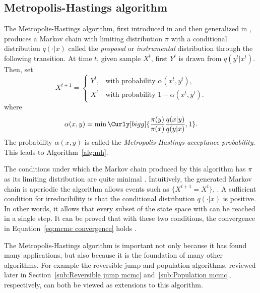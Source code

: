 \subsection{Metropolis-Hastings algorithm}
\label{sub:Metropolis-Hastings algorithm}

The Metropolis-Hastings algorithm, first introduced in \cite{Metropolis:1953ex} and then generalized in \cite{Hastings:1970gd}, produces a Markov chain with limiting distribution $\pi$ with a conditional distribution $q(\cdot|x)$ called the \emph{proposal} or \emph{instrumental} distribution through the following transition. At time $t$, given sample $X^t$, first $Y^t$ is drawn from $q(y^t|x^t)$. Then, set
\begin{equation*}
  X^{t+1} =
  \begin{cases}
    Y^t, &\text{with probability } \alpha(x^t,y^t),\\
    X^t  &\text{with probability } 1 - \alpha(x^t,y^t).
  \end{cases}
\end{equation*}
where
\begin{equation}
  \alpha(x,y) =
  \min\Curly[bigg]{\frac{\pi(y)}{\pi(x)}\frac{q(x|y)}{q(y|x)},1}.
\end{equation}
The probability $\alpha(x,y)$ is called the \emph{Metropolis-Hastings acceptance probability}. This leads to Algorithm~\ref{alg:mh}.



The conditions under which the Markov chain produced by this algorithm has $\pi$ as its limiting distribution are quite minimal \cite[][sec.~7.3.2]{Robert:2004tn}. Intuitively, the generated Markov chain is aperiodic  the algorithm allows events such as $\{X^{t+1} = X^t\}$, . A sufficient condition for irreducibility is that the conditional distribution $q(\cdot|x)$ is positive. In other words, it allows that every subset of the state space with can be reached in a single step. It can be proved that with these two conditions, the convergence in Equation~\eqref{eq:mcmc convergence} holds \cite[][Theorem~7.4 and Corollary~7.5]{Robert:2004tn}.

The Metropolis-Hastings algorithm is important not only because it has found many applications, but also because it is the foundation of many other algorithms. For example the reversible jump \mcmc and population \mcmc algorithms, reviewed later in Section~\ref{sub:Reversible jump mcmc} and~\ref{sub:Population mcmc}, respectively, can both be viewed as extensions to this algorithm.

